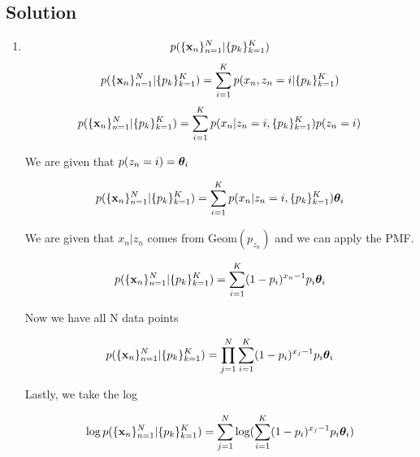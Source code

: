 \documentclass[submit]{harvardml}
\begin{document}
\subsection*{Solution}
\begin{enumerate}
    \item 
        \begin{equation*}
            p(\{\mathbf{x}_n\}^N_{n=1}|\{p_k\}^K_{k = 1})
        \end{equation*}
        \begin{equation*}
             p(\{\mathbf{x}_n\}^N_{n=1}|\{p_k\}^K_{k = 1}) = \sum_{i=1}^K p(x_n, z_n = i | \{p_k\}^K_{k = 1})
        \end{equation*}
        \begin{equation*}
             p(\{\mathbf{x}_n\}^N_{n=1}|\{p_k\}^K_{k = 1}) = \sum_{i=1}^K p(x_n | z_n = i, \{p_k\}^K_{k = 1}) p(z_n = i)
        \end{equation*}
        \begin{center}
            We are given that $p(z_n = i) = \boldsymbol{\theta}_i$
        \end{center}
        \begin{equation*}
             p(\{\mathbf{x}_n\}^N_{n=1}|\{p_k\}^K_{k = 1}) = \sum_{i=1}^K p(x_n | z_n = i, \{p_k\}^K_{k = 1}) \boldsymbol{\theta}_{i}
        \end{equation*}
        \begin{center}
            We are given that $x_n|z_n$ comes from Geom$(p_{z_n})$ and we can apply the PMF.
        \end{center}
        \begin{equation*}
            p(\{\mathbf{x}_n\}^N_{n=1}|\{p_k\}^K_{k = 1}) = \sum_{i=1}^K (1-p_i)^{x_n - 1}p_i \boldsymbol{\theta}_{i}
        \end{equation*}
        \begin{center}
            Now we have all N data points
        \end{center}
        \begin{equation*}
            p(\{\mathbf{x}_n\}^N_{n=1}|\{p_k\}^K_{k = 1}) = \prod_{j = 1}^N\sum_{i=1}^K (1-p_i)^{x_j - 1}p_i \boldsymbol{\theta}_{i}
        \end{equation*}
        \begin{center}
            Lastly, we take the log
        \end{center}
        \begin{equation*}
            \log p(\{\mathbf{x}_n\}^N_{n=1}|\{p_k\}^K_{k = 1}) = \sum_{j = 1}^N\log(\sum_{i=1}^K (1-p_i)^{x_j - 1}p_i \boldsymbol{\theta}_{i})
        \end{equation*}
        

\end{enumerate}
\end{document}
